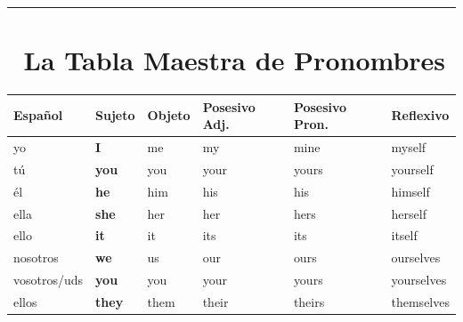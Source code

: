 \documentclass[
  spanish,
  letterpaper,
]{scrbook}
\begin{document}
\begin{center}\rule{0.5\linewidth}{0.5pt}\end{center}

\section{📐 La Tabla Maestra de
Pronombres}\label{la-tabla-maestra-de-pronombres}

\begin{longtable}[]{@{}
  >{\raggedright\arraybackslash}p{}
  >{\raggedright\arraybackslash}p{}
  >{\raggedright\arraybackslash}p{}
  >{\raggedright\arraybackslash}p{}
  >{\raggedright\arraybackslash}p{}
  >{\raggedright\arraybackslash}p{}@{}}
\toprule\noalign{}
\begin{minipage}[b]{\linewidth}\raggedright
Español
\end{minipage} & \begin{minipage}[b]{\linewidth}\raggedright
Sujeto
\end{minipage} & \begin{minipage}[b]{\linewidth}\raggedright
Objeto
\end{minipage} & \begin{minipage}[b]{\linewidth}\raggedright
Posesivo Adj.
\end{minipage} & \begin{minipage}[b]{\linewidth}\raggedright
Posesivo Pron.
\end{minipage} & \begin{minipage}[b]{\linewidth}\raggedright
Reflexivo
\end{minipage} \\
\midrule\noalign{}
\endhead
\bottomrule\noalign{}
\endlastfoot
yo & \textbf{I} & me & my & mine & myself \\
tú & \textbf{you} & you & your & yours & yourself \\
él & \textbf{he} & him & his & his & himself \\
ella & \textbf{she} & her & her & hers & herself \\
ello & \textbf{it} & it & its & its & itself \\
nosotros & \textbf{we} & us & our & ours & ourselves \\
vosotros/uds & \textbf{you} & you & your & yours & yourselves \\
ellos & \textbf{they} & them & their & theirs & themselves \\
\end{longtable}
\end{document}
